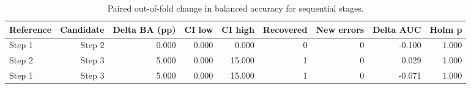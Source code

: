 \begin{table}[t]
\centering
\caption{Paired out-of-fold change in balanced accuracy for sequential stages.}
\label{tab:paired_stage_changes}
\footnotesize
\setlength{\tabcolsep}{4pt}
\begin{tabular}{lrrrrrrrr}
\toprule
Reference & Candidate & Delta BA (pp) & CI low & CI high & Recovered & New errors & Delta AUC & Holm p \\
\midrule
Step 1 & Step 2 & 0.000 & 0.000 & 0.000 & 0 & 0 & -0.100 & 1.000 \\
Step 2 & Step 3 & 5.000 & 0.000 & 15.000 & 1 & 0 & 0.029 & 1.000 \\
Step 1 & Step 3 & 5.000 & 0.000 & 15.000 & 1 & 0 & -0.071 & 1.000 \\
\bottomrule
\end{tabular}
\end{table}
